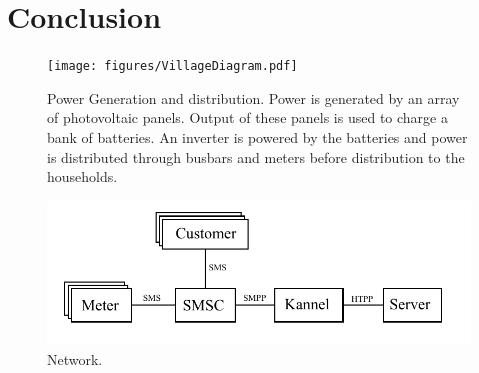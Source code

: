 \documentclass[conference]{IEEEtran}
\begin{document}
\section{Conclusion}


\begin{figure}[]
\begin{center}
\texttt{[image: figures/VillageDiagram.pdf]}
\end{center}
\caption{Power Generation and distribution.  
Power is generated by an array of photovoltaic panels. 
Output of these panels is used to charge a bank of batteries.
An inverter is powered by the batteries and power is distributed
through busbars and meters before distribution to the households.}
\label{ShedWiringDiagram}
\end{figure}


\begin{figure}[]
\begin{center}
\includegraphics[width=\columnwidth]{figures/NetworkDiagram.pdf}
\end{center}
\caption{Network.}
\label{SoftwareDiagram}
\end{figure}
\end{document}
